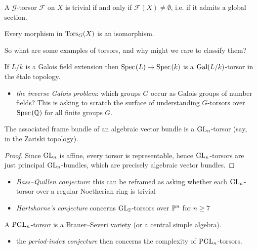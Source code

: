 \documentclass[11pt,openany]{book}
\begin{document}
\begin{proposition}\label{prop:torsor-trivial-iff-global-section} 
A $\mathcal{G}$-torsor $\mathcal{F}$ on $X$ is trivial if and only if $\mathcal{F}(X) \ne \emptyset$, i.e. if it admits a global section.
\end{proposition}



\begin{theorem} Every morphism in $\Tors_G(X)$ is an isomorphism.
\end{theorem}

So what are some examples of torsors, and why might we care to classify them?

\begin{example}\label{exa:galois-field-extn-torsor} 
If $L/k$ is a Galois field extension then $\Spec(L) \to \Spec(k)$ is a $\Gal(L/k)$-torsor in the \'etale topology.
\end{example}
\begin{itemize}
\item \textit{the inverse Galois problem}: which groups $G$ occur as Galois groups of number fields? This is asking to scratch the surface of understanding $G$-torsors over $\Spec(\Q)$ for all finite groups $G$.
\end{itemize}

\begin{example}
The associated frame bundle of an algebraic vector bundle is a $\GL_n$-torsor (say, in the Zariski topology).
\end{example}
\begin{proof} Since $\GL_n$ is affine, every torsor is representable, hence $\GL_n$-torsors are just principal $\GL_n$-bundles, which are precisely algebraic vector bundles.
\end{proof}
\begin{itemize}
    \item \textit{Bass--Quillen conjecture}: this can be reframed as asking whether each $\GL_n$-torsor over a regular Noetherian ring is trivial
    \item \textit{Hartshorne's conjecture} concerns $\GL_2$-torsors over $\P^n$ for $n\ge7$
\end{itemize}

\begin{example} A $\PGL_n$-torsor is a Brauer--Severi variety (or a central simple algebra).
\end{example}
\begin{itemize}
    \item the \textit{period-index conjecture} then concerns the complexity of $\PGL_n$-torsors.
\end{itemize}
\end{document}

